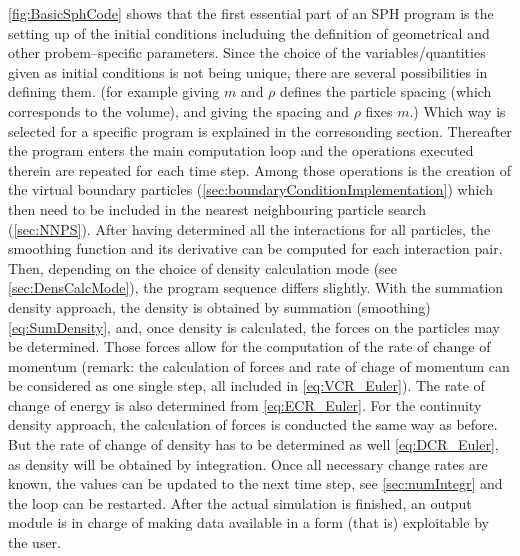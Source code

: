 \documentclass{report}
\begin{document}
\ref{fig:BasicSphCode} shows that the first essential part of an SPH program is the setting up of the initial conditions includuing the definition of geometrical and other
probem--specific parameters. Since the choice of the variables/quantities given as 
initial conditions is not being unique, there are several possibilities in defining 
them. (for example giving $m$ and $\rho$ defines the particle spacing (which corresponds
to the volume), and giving the spacing and $\rho$ fixes $m$.) Which way is selected for 
a specific program is explained in the corresonding section. 
Thereafter the program enters the main computation loop and the operations executed 
therein are repeated for each time step. Among those operations is the creation of the 
virtual boundary particles (\ref{sec:boundaryConditionImplementation}) which then 
need to be included in the nearest neighbouring particle search (\ref{sec:NNPS}). 
After having determined all the interactions for all particles, the smoothing function 
and its derivative can be computed for each interaction pair. Then, depending on the 
choice of density calculation mode (see \ref{sec:DensCalcMode}), the program sequence differs slightly. 
With the summation density approach, the density is obtained by summation 
(smoothing)\ref{eq:SumDensity}, and, once density is calculated, the forces on the 
particles may be determined. Those forces allow for the computation of the rate
of change of momentum (remark: the calculation of forces and rate of chage of  momentum 
can be considered as one single step, all included in \ref{eq:VCR_Euler}). The 
rate of change of energy is also determined from \ref{eq:ECR_Euler}.
For the continuity density approach, the calculation of forces is conducted the same way as before. But the rate of change of density 
has to be determined as well \ref{eq:DCR_Euler}, as density will be obtained by integration. 
Once all necessary change rates are known, the values can be updated to the next time step, see \ref{sec:numIntegr} and the loop can be restarted. After the actual simulation is finished, an output module is in charge of making data available in a form (that is) exploitable by the user.
\end{document}

